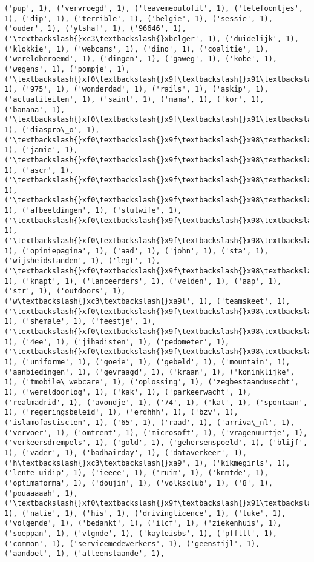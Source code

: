 \documentclass{article}
\begin{document}
\begin{Verbatim}[commandchars=\\\{\}]
('pup', 1), ('vervroegd', 1), ('leavemeoutofit', 1), ('telefoontjes', 1), ('dip', 1), ('terrible', 1), ('belgie', 1), ('sessie', 1), ('ouder', 1), ('ytshaf', 1), ('96646', 1), ('\textbackslash{}xc3\textbackslash{}xbclger', 1), ('duidelijk', 1), ('klokkie', 1), ('webcams', 1), ('dino', 1), ('coalitie', 1), ('wereldberoemd', 1), ('dingen', 1), ('gaweg', 1), ('kobe', 1), ('wegens', 1), ('pompje', 1), ('\textbackslash{}xf0\textbackslash{}x9f\textbackslash{}x91\textbackslash{}x80', 1), ('975', 1), ('wonderdad', 1), ('rails', 1), ('askip', 1), ('actualiteiten', 1), ('saint', 1), ('mama', 1), ('kor', 1), ('banana', 1), ('\textbackslash{}xf0\textbackslash{}x9f\textbackslash{}x91\textbackslash{}x85', 1), ('diaspro\_o', 1), ('\textbackslash{}xf0\textbackslash{}x9f\textbackslash{}x98\textbackslash{}x91', 1), ('jamie', 1), ('\textbackslash{}xf0\textbackslash{}x9f\textbackslash{}x98\textbackslash{}x95', 1), ('ascr', 1), ('\textbackslash{}xf0\textbackslash{}x9f\textbackslash{}x98\textbackslash{}x8a', 1), ('\textbackslash{}xf0\textbackslash{}x9f\textbackslash{}x98\textbackslash{}x81', 1), ('afbeeldingen', 1), ('slutwife', 1), ('\textbackslash{}xf0\textbackslash{}x9f\textbackslash{}x98\textbackslash{}x85', 1), ('\textbackslash{}xf0\textbackslash{}x9f\textbackslash{}x98\textbackslash{}x84', 1), ('opiniepagina', 1), ('aad', 1), ('john', 1), ('sta', 1), ('wijsheidstanden', 1), ('legt', 1), ('\textbackslash{}xf0\textbackslash{}x9f\textbackslash{}x98\textbackslash{}xb1', 1), ('knapt', 1), ('lanceerders', 1), ('velden', 1), ('aap', 1), ('str', 1), ('outdoors', 1), ('w\textbackslash{}xc3\textbackslash{}xa9l', 1), ('teamskeet', 1), ('\textbackslash{}xf0\textbackslash{}x9f\textbackslash{}x98\textbackslash{}xa5', 1), ('shemale', 1), ('feestje', 1), ('\textbackslash{}xf0\textbackslash{}x9f\textbackslash{}x98\textbackslash{}x9a', 1), ('4ee', 1), ('jihadisten', 1), ('pedometer', 1), ('\textbackslash{}xf0\textbackslash{}x9f\textbackslash{}x98\textbackslash{}x98', 1), ('uniforme', 1), ('goeie', 1), ('gebeld', 1), ('mountain', 1), ('aanbiedingen', 1), ('gevraagd', 1), ('kraan', 1), ('koninklijke', 1), ('tmobile\_webcare', 1), ('oplossing', 1), ('zegbestaandusecht', 1), ('wereldoorlog', 1), ('kak', 1), ('parkeerwacht', 1), ('realmadrid', 1), ('avondje', 1), ('74', 1), ('kat', 1), ('spontaan', 1), ('regeringsbeleid', 1), ('erdhhh', 1), ('bzv', 1), ('islamofastiscten', 1), ('65', 1), ('raad', 1), ('arriva\_nl', 1), ('vervoer', 1), ('omtrent', 1), ('microsoft', 1), ('vragenuurtje', 1), ('verkeersdrempels', 1), ('gold', 1), ('gehersenspoeld', 1), ('blijf', 1), ('vader', 1), ('badhairday', 1), ('dataverkeer', 1), ('h\textbackslash{}xc3\textbackslash{}xa9', 1), ('kikmegirls', 1), ('lente-uidip', 1), ('ieeee', 1), ('ruim', 1), ('knmtde', 1), ('optimaforma', 1), ('doujin', 1), ('volksclub', 1), ('8', 1), ('pouaaaaah', 1), ('\textbackslash{}xf0\textbackslash{}x9f\textbackslash{}x91\textbackslash{}x8c\textbackslash{}xf0\textbackslash{}x9f\textbackslash{}x8e\textbackslash{}x89', 1), ('natie', 1), ('his', 1), ('drivinglicence', 1), ('luke', 1), ('volgende', 1), ('bedankt', 1), ('ilcf', 1), ('ziekenhuis', 1), ('soeppan', 1), ('vlgnde', 1), ('kayleisbs', 1), ('pffttt', 1), ('common', 1), ('servicemedewerkers', 1), ('geenstijl', 1), ('aandoet', 1), ('alleenstaande', 1), 
\end{Verbatim}
\end{document}
